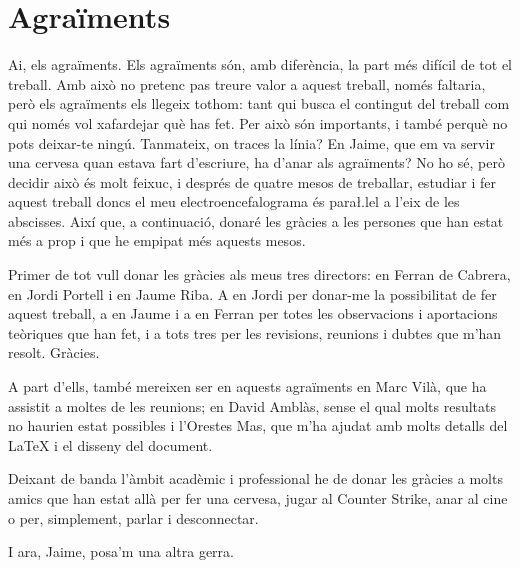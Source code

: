 \chapter*{Agraïments}
Ai, els agraïments. Els agraïments són, amb diferència, la part més difícil de tot el treball. Amb això no pretenc pas treure valor a aquest treball, només faltaria, però els agraïments els llegeix tothom: tant qui busca el contingut del treball com qui només vol xafardejar què has fet. Per això són importants, i també perquè no pots deixar-te ningú. Tanmateix, on traces la línia? En Jaime, que em va servir una cervesa quan estava fart d'escriure, ha d'anar als agraïments? No ho sé, però decidir això és molt feixuc, i després de quatre mesos de treballar, estudiar i fer aquest treball doncs el meu electroencefalograma és para\l.lel a l'eix de les abscisses. Així que, a continuació, donaré les gràcies a les persones que han estat més a prop i que he empipat més aquests mesos.

Primer de tot vull donar les gràcies als meus tres directors: en Ferran de Cabrera, en Jordi Portell i en Jaume Riba. A en Jordi per donar-me la possibilitat de fer aquest treball, a en Jaume i a en Ferran per totes les observacions i aportacions teòriques que han fet, i a tots tres per les revisions, reunions i dubtes que m'han resolt. Gràcies.

A part d'ells, també mereixen ser en aquests agraïments en Marc Vilà, que ha assistit a moltes de les reunions; en David Amblàs, sense el qual molts resultats no haurien estat possibles i l'Orestes Mas, que m'ha ajudat amb molts detalls del \LaTeX{} i el disseny del document.

Deixant de banda l'àmbit acadèmic i professional he de donar les gràcies a molts amics que han estat allà per fer una cervesa, jugar al Counter Strike, anar al cine o per, simplement, parlar i desconnectar.

I ara, Jaime, posa'm una altra gerra.
